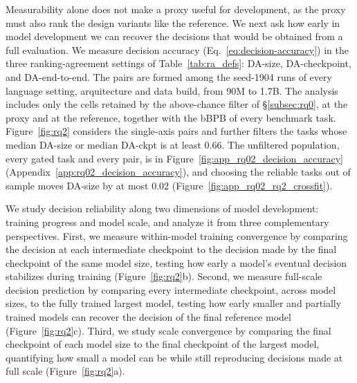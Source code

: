 Measurability alone does not make a proxy useful for development, as the proxy must also rank the design variants like the reference.
We next ask how early in model development we can recover the decisions that would be obtained from a full evaluation.
We measure decision accuracy (Eq.~\ref{eq:decision-accuracy}) in the three ranking-agreement settings of Table~\ref{tab:ra_defs}: DA-size, DA-checkpoint, and DA-end-to-end.
The pairs are formed among the seed-1904 runs of every language setting, arquitecture and data build, from 90M to 1.7B.
The analysis includes only the cells retained by the above-chance filter of \S\ref{subsec:rq0}, at the proxy and at the reference, together with the bBPB of every benchmark task.
Figure~\ref{fig:rq2} considers the single-axis pairs and further filters the tasks whose median DA-size or median DA-ckpt is at least 0.66.
The unfiltered population, every gated task and every pair, is in Figure~\ref{fig:app_rq02_decision_accuracy} (Appendix~\ref{app:rq02_decision_accuracy}), and choosing the reliable tasks out of sample moves DA-size by at most 0.02 (Figure~\ref{fig:app_rq02_rq2_crossfit}).

We study decision reliability along two dimensions of model development: training progress and model scale, and analyze it from three complementary perspectives. First, we measure within-model training convergence by comparing the decision at each intermediate checkpoint to the decision made by the final checkpoint of the same model size, testing how early a model's eventual decision stabilizes during training (Figure~\ref{fig:rq2}b). Second, we measure full-scale decision prediction by comparing every intermediate checkpoint, across model sizes, to the fully trained largest model, testing how early smaller and partially trained models can recover the decision of the final reference model (Figure~\ref{fig:rq2}c). Third, we study scale convergence by comparing the final checkpoint of each model size to the final checkpoint of the largest model, quantifying how small a model can be while still reproducing decisions made at full scale (Figure~\ref{fig:rq2}a).

